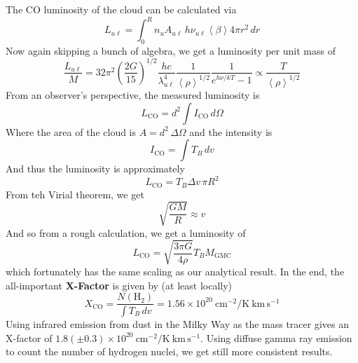 \documentclass[10pt]{article}
\numberwithin{equation}{section}
\newcommand{\n}{\noindent}
\newcommand{\avg}[1]{\left\langle#1\right\rangle}
\begin{document}
  \n The CO luminosity of the cloud can be calculated via
  \begin{equation}
    \label{eq:mols:16} L_{u\ell} = \int_0^R n_u A_{u\ell}\,h\nu_{u\ell}
    \avg{\beta} 4\pi r^2\,dr
  \end{equation}
  Now again skipping a bunch of algebra, we get a luminosity per unit mass of
  \begin{equation}
    \label{eq:mols:17} \frac{L_{u\ell}}{M} = 32\pi^2
    \left(\frac{2G}{15}\right)^{1/2} \frac{hc}{\lambda_{u\ell}^4}
    \frac{1}{\avg{\rho}^{1/2}} \frac{1}{e^{h\nu/kT}-1} \propto
    \frac{T}{\avg{\rho}^{1/2}}
  \end{equation}
  From an observer's perspective, the measured luminosity is
  \begin{equation}
    \label{eq:mols:17} L_{\mathrm{CO}} = d^2\int I_{\mathrm{CO}}\,d\Omega
  \end{equation}
  Where the area of the cloud is $A = d^2\,\Delta \Omega$ and the intensity is
  \begin{equation}
    \label{eq:mols:18} I_{\mathrm{CO}} = \int T_B\,dv
  \end{equation}
  And thus the luminosity is approximately
  \begin{equation}
    \label{eq:mols:19} L_{\mathrm{CO}} = T_B \Delta v\,\pi R^2
  \end{equation}
  From teh Virial theorem, we get
  \begin{equation}
    \label{eq:mols:20} \sqrt{\frac{GM}{R}}\approx v
  \end{equation}
  And so from a rough calculation, we get a luminosity of
  \begin{equation}
    \label{eq:mols:21} L_{\mathrm{CO}} = \sqrt{\frac{3\pi G}{4\rho}} T_B
    M_{\mathrm{GMC}}
  \end{equation}
  which fortunately has the same scaling as our analytical result. In the end,
  the all-important \textbf{X-Factor} is given by (at least locally)
  \begin{equation}
    \label{eq:mols:22} X_{\mathrm{CO}} = \frac{N(\mathrm{H_2})}{\int T_B\,dv} = 
    1.56\times 10^{20}\ \mathrm{cm^{-2} / K\ km\,s^{-1}}
  \end{equation}
  Using infrared emission from dust in the Milky Way as the mass tracer gives
  an X-factor of $1.8(\pm 0.3)\times 10^{20}\ \mathrm{cm^{-2} / K\
  km\,s^{-1}}$. Using diffuse gamma ray emission to count the number of
  hydrogen nuclei, we get still more consistent results.\\
  
\end{document}
